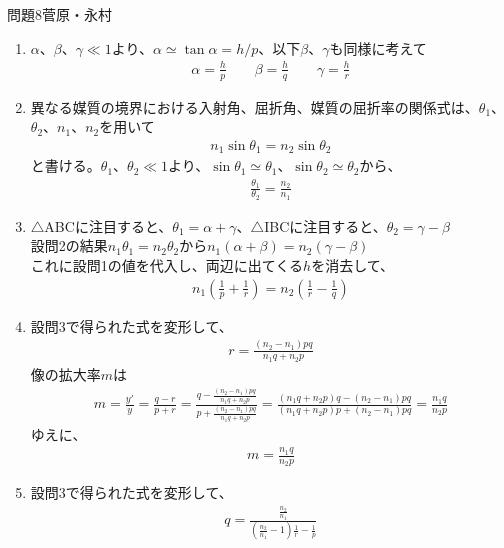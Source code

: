 \documentclass[fleqn]{jbook}
\begin{document}
\begin{answer}{問題8}{菅原・永村}
\begin{enumerate}
\item $\alpha$、$\beta$、$\gamma \ll 1$より、$\alpha \simeq \tan \alpha = h/p$、以下$\beta$、$\gamma$も同様に考えて
\begin{eqnarray}
\alpha = \frac{h}{p} \qquad \beta = \frac{h}{q} \qquad \gamma = \frac{h}{r}
\end{eqnarray}
\item 異なる媒質の境界における入射角、屈折角、媒質の屈折率の関係式は、$\theta_1$、$\theta_2$、$n_1$、$n_2$を用いて
\begin{eqnarray}
n_1 \sin \theta_1 = n_2 \sin \theta_2
\end{eqnarray}
と書ける。$\theta_1$、$\theta_2 \ll 1$より、$\sin \theta_1 \simeq \theta_1$、$\sin \theta_2 \simeq \theta_2$から、
\begin{eqnarray}
\frac{\theta_1}{\theta_2} = \frac{n_2}{n_1}
\end{eqnarray}
\item $\triangle$ABCに注目すると、$\theta_1 = \alpha + \gamma$、$\triangle$IBCに注目すると、$\theta_2 = \gamma - \beta$ \\
設問2の結果$n_1 \theta_1 = n_2 \theta_2$から$n_1 (\alpha + \beta) = n_2 (\gamma - \beta)$ \\
これに設問1の値を代入し、両辺に出てくる$h$を消去して、
\begin{eqnarray}
n_1 (\frac{1}{p} + \frac{1}{r}) = n_2 (\frac{1}{r} - \frac{1}{q})
\end{eqnarray}
\item 設問3で得られた式を変形して、
\begin{eqnarray}
r = \frac{(n_2 - n_1)pq}{n_1 q + n_2 p}
\end{eqnarray}
像の拡大率$m$は
\begin{eqnarray}
m = \frac{y'}{y} = \frac{q-r}{p+r} = \frac{q - \frac{(n_2 - n_1)pq}{n_1 q + n_2 p}}{p + \frac{(n_2 - n_1)pq}{n_1 q + n_2 p}} = \frac{(n_1 q + n_2 p)q - (n_2 - n_1)pq}{(n_1 q + n_2 p)p + (n_2 - n_1)pq} = \frac{n_1 q}{n_2 p}
\end{eqnarray}
ゆえに、
\begin{eqnarray}
m = \frac{n_1 q}{n_2 p}
\end{eqnarray}
\item 設問3で得られた式を変形して、
\begin{eqnarray}
q = \frac{\frac{n_2}{n_1}}{(\frac{n_2}{n_1}-1)\frac{1}{r}-\frac{1}{p}}
\end{eqnarray}

\end{enumerate}
\end{answer}
\end{document}
